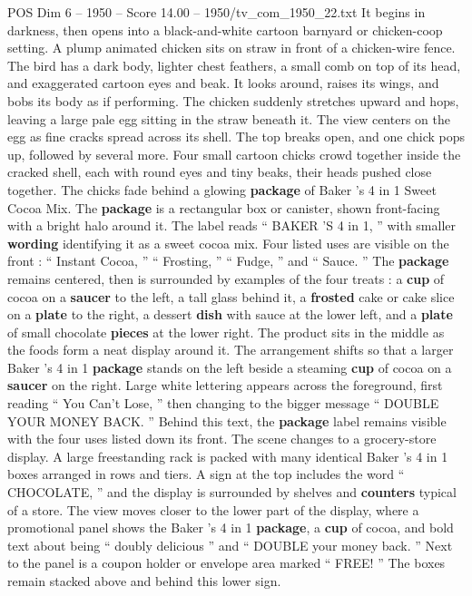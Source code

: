 \begin{textsample}{POS Dim 6 – 1950 – Score 14.00 – 1950/tv\_com\_1950\_22.txt}  \label{ex:f6_pos_009}
It begins in darkness, then opens into a black-and-white cartoon barnyard or chicken-coop setting.
A plump animated chicken sits on straw in front of a chicken-wire fence.
The bird has a dark body, lighter chest feathers, a small comb on top of its head, and exaggerated cartoon eyes and beak.
It looks around, raises its wings, and bobs its body as if performing.
The chicken suddenly stretches upward and hops, leaving a large pale egg sitting in the straw beneath it.
The view centers on the egg as fine cracks spread across its shell.
The top breaks open, and one chick pops up, followed by several more.
Four small cartoon chicks crowd together inside the cracked shell, each with round eyes and tiny beaks, their heads pushed close together.
The chicks fade behind a glowing \textbf{package} of Baker ’s 4 in 1 Sweet Cocoa Mix.
The \textbf{package} is a rectangular box or canister, shown front-facing with a bright halo around it.
The label reads “ BAKER ’S 4 in 1, ” with smaller \textbf{wording} identifying it as a sweet cocoa mix.
Four listed uses are visible on the front : “ Instant Cocoa, ” “ Frosting, ” “ Fudge, ” and “ Sauce. ” The \textbf{package} remains centered, then is surrounded by examples of the four treats : a \textbf{cup} of cocoa on a \textbf{saucer} to the left, a tall glass behind it, a \textbf{frosted} cake or cake slice on a \textbf{plate} to the right, a dessert \textbf{dish} with sauce at the lower left, and a \textbf{plate} of small chocolate \textbf{pieces} at the lower right.
The product sits in the middle as the foods form a neat display around it.
The arrangement shifts so that a larger Baker ’s 4 in 1 \textbf{package} stands on the left beside a steaming \textbf{cup} of cocoa on a \textbf{saucer} on the right.
Large white lettering appears across the foreground, first reading “ You Can't Lose, ” then changing to the bigger message “ DOUBLE YOUR MONEY BACK. ” Behind this text, the \textbf{package} label remains visible with the four uses listed down its front.
The scene changes to a grocery-store display.
A large freestanding rack is packed with many identical Baker ’s 4 in 1 boxes arranged in rows and tiers.
A sign at the top includes the word “ CHOCOLATE, ” and the display is surrounded by shelves and \textbf{counters} typical of a store.
The view moves closer to the lower part of the display, where a promotional panel shows the Baker ’s 4 in 1 \textbf{package}, a \textbf{cup} of cocoa, and bold text about being “ doubly delicious ” and “ DOUBLE your money back. ” Next to the panel is a coupon holder or envelope area marked “ FREE! ” The boxes remain stacked above and behind this lower sign.

\end{textsample}
